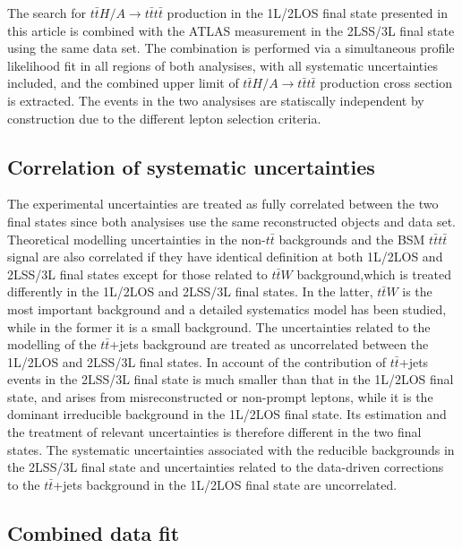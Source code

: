 The search for $t\bar{t}H/A \to t\bar{t}t\bar{t}$ production in the 1L/2LOS final state presented in this article is combined with the ATLAS measurement in the 2LSS/3L final state using the same data set. 
The combination is performed via a simultaneous profile likelihood fit in all regions of both analysises, with all systematic uncertainties included, and the combined upper limit of $t\bar{t}H/A \to t\bar{t}t\bar{t}$ production cross section is extracted. 
The events in the two analysises are statiscally independent by construction due to the different lepton selection criteria.

\subsection{Correlation of systematic uncertainties}
\label{sub:combination_correlation}

The experimental uncertainties are treated as fully correlated between the two final states since both analysises use the same reconstructed objects and data set. 
Theoretical modelling uncertainties in the non-$t\bar{t}$ backgrounds and the BSM $t\bar{t}t\bar{t}$ signal are also correlated if they have identical definition at both 1L/2LOS and 2LSS/3L final states except for those related to $t\bar{t}W$ background,which is treated differently in the 1L/2LOS and 2LSS/3L final states. In the latter, $t\bar{t}W$ is the most important background and a detailed systematics model has been studied, while in the former it is a small background.
The uncertainties related to the modelling of the $t\bar{t}$+jets background are treated as uncorrelated between the 1L/2LOS and 2LSS/3L final states. In account of the contribution of $t\bar{t}$+jets events in the 2LSS/3L final state is much smaller than that in the 1L/2LOS final state, and arises from misreconstructed or non-prompt leptons, while it is the dominant irreducible background in the 1L/2LOS final state. Its estimation and the treatment of relevant uncertainties is therefore different in the two final states. 
The systematic uncertainties associated with the reducible backgrounds in the 2LSS/3L final state and uncertainties related to the data-driven corrections to the $t\bar{t}$+jets background in the 1L/2LOS final state are uncorrelated.

\subsection{Combined data fit}
\label{sub:combination_fit}

